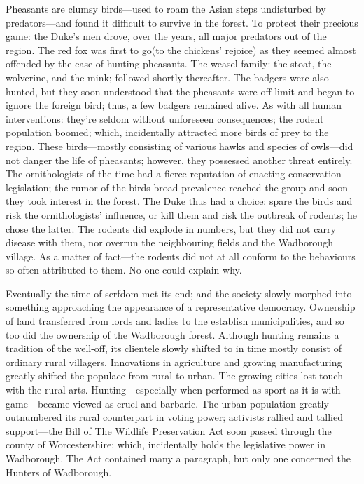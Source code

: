 Pheasants are clumsy birds---used to roam the Asian steps undisturbed by predators---and found it difficult to survive in the forest. To protect their precious game: the Duke's men drove, over the years, all major predators out of the region. The red fox was first to go(to the chickens' rejoice) as they seemed almost offended by the ease of hunting pheasants. The weasel family: the stoat, the wolverine, and the mink; followed shortly thereafter. The badgers were also hunted, but they soon understood that the pheasants were off limit and began to ignore the foreign bird; thus, a few badgers remained alive. As with all human interventions: they're seldom without unforeseen consequences; the rodent population boomed; which, incidentally attracted more birds of prey to the region. These birds---mostly consisting of various hawks and species of owls---did not danger the life of pheasants; however, they possessed another threat entirely. The ornithologists of the time had a fierce reputation of enacting conservation legislation; the rumor of the birds broad prevalence reached the group and soon they took interest in the forest. The Duke thus had a choice: spare the birds and risk the ornithologists' influence, or kill them and risk the outbreak of rodents; he chose the latter. The rodents did explode in numbers, but they did not carry disease with them, nor overrun the neighbouring fields and the Wadborough village. As a matter of fact---the rodents did not at all conform to the behaviours so often attributed to them. No one could explain why.

Eventually the time of serfdom met its end; and the society slowly morphed into something approaching the appearance of a representative democracy. Ownership of land transferred from lords and ladies to the establish municipalities, and so too did the ownership of the Wadborough forest. Although hunting remains a tradition of the well-off, its clientele slowly shifted to in time mostly consist of ordinary rural villagers.   
Innovations in agriculture and growing manufacturing greatly shifted the populace from rural to urban. The growing cities lost touch with the rural arts. Hunting---especially when performed as sport as it is with game---became viewed as cruel and barbaric. The urban population greatly outnumbered its rural counterpart in voting power; activists rallied and tallied support---the Bill of The Wildlife Preservation Act soon passed through the county of Worcestershire; which, incidentally holds the legislative power in Wadborough. The Act contained many a paragraph, but only one concerned the Hunters of Wadborough. 

